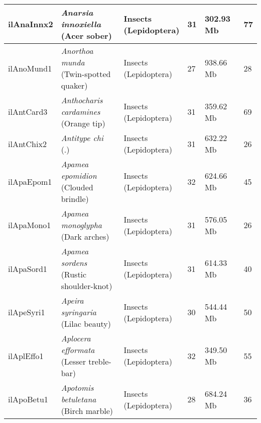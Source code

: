 \begin{centering}
\begin{longtable}{l|l|l|l|l|l}
ilAnaInnx2 & \makecell[{l}]{\textit{Anarsia innoxiella} \\ (Acer sober)} & \makecell[{l}]{Insects \\ (Lepidoptera)} & 31 & 302.93 Mb & 77  \\ \hline
ilAnoMund1 & \makecell[{l}]{\textit{Anorthoa munda} \\ (Twin-spotted quaker)} & \makecell[{l}]{Insects \\ (Lepidoptera)} & 27 & 938.66 Mb & 28  \\ \hline
ilAntCard3 & \makecell[{l}]{\textit{Anthocharis cardamines} \\ (Orange tip)} & \makecell[{l}]{Insects \\ (Lepidoptera)} & 31 & 359.62 Mb & 69  \\ \hline
ilAntChix2 & \makecell[{l}]{\textit{Antitype chi} \\ (.)} & \makecell[{l}]{Insects \\ (Lepidoptera)} & 31 & 632.22 Mb & 26  \\ \hline
ilApaEpom1 & \makecell[{l}]{\textit{Apamea epomidion} \\ (Clouded brindle)} & \makecell[{l}]{Insects \\ (Lepidoptera)} & 32 & 624.66 Mb & 45  \\ \hline
ilApaMono1 & \makecell[{l}]{\textit{Apamea monoglypha} \\ (Dark arches)} & \makecell[{l}]{Insects \\ (Lepidoptera)} & 31 & 576.05 Mb & 26  \\ \hline
ilApaSord1 & \makecell[{l}]{\textit{Apamea sordens} \\ (Rustic shoulder-knot)} & \makecell[{l}]{Insects \\ (Lepidoptera)} & 31 & 614.33 Mb & 40  \\ \hline
ilApeSyri1 & \makecell[{l}]{\textit{Apeira syringaria} \\ (Lilac beauty)} & \makecell[{l}]{Insects \\ (Lepidoptera)} & 30 & 544.44 Mb & 50  \\ \hline
ilAplEffo1 & \makecell[{l}]{\textit{Aplocera efformata} \\ (Lesser treble-bar)} & \makecell[{l}]{Insects \\ (Lepidoptera)} & 32 & 349.50 Mb & 55  \\ \hline
ilApoBetu1 & \makecell[{l}]{\textit{Apotomis betuletana} \\ (Birch marble)} & \makecell[{l}]{Insects \\ (Lepidoptera)} & 28 & 684.24 Mb & 36  \\ \hline

\end{longtable}
\end{centering}
